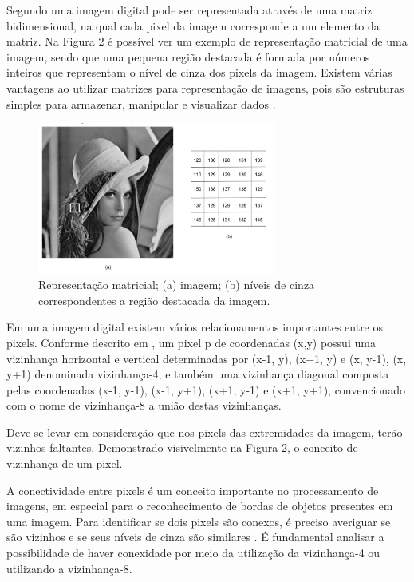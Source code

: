 Segundo  uma imagem digital pode ser representada através de uma matriz bidimensional, na qual cada pixel da imagem corresponde a um elemento da matriz. Na Figura 2 é possível ver um exemplo de representação matricial de uma imagem, sendo que uma pequena região destacada é formada por números inteiros que representam o nível de cinza dos pixels da imagem. Existem várias vantagens ao utilizar matrizes para representação de imagens, pois são estruturas simples para armazenar, manipular e visualizar dados \cite{PEDRINI2008}. 

 \begin{figure}[h]
	\centering
	\includegraphics[width=0.7\textwidth]{Imagens/imagem6} 
	\caption[Representação matricial;]{Representação matricial; (a) imagem; (b) níveis de cinza correspondentes a região
destacada da imagem.}
	\label{fig:tux_laplace}
\end{figure}


Em uma imagem digital existem vários relacionamentos importantes entre os pixels. Conforme descrito em , 
um pixel p de coordenadas (x,y) possui uma vizinhança horizontal e vertical determinadas por (x-1, y), (x+1, y) e (x, y-1), (x, y+1) denominada vizinhança-4, e também uma vizinhança diagonal composta pelas coordenadas (x-1, y-1), (x-1, y+1), (x+1, y-1) e (x+1, y+1), convencionado com o nome de vizinhança-8 a união destas vizinhanças.

Deve-se levar em consideração que nos pixels das extremidades da imagem, terão vizinhos faltantes.  Demonstrado visivelmente na Figura 2, o conceito de vizinhança de um pixel. %

A conectividade entre pixels é um conceito importante no processamento de imagens, em especial para o reconhecimento de bordas de objetos presentes em uma imagem. Para identificar se dois pixels são conexos, é preciso averiguar se são vizinhos e se seus níveis de cinza são similares . É fundamental analisar a possibilidade de haver conexidade por meio da utilização da vizinhança-4 ou utilizando a vizinhança-8.

